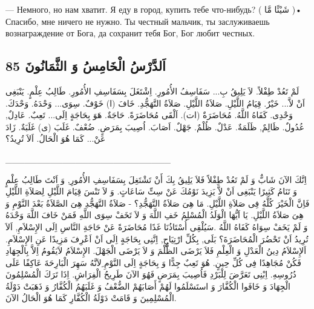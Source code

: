 \documentclass[a5paper]{article}
\begin{document}
— Немного, но нам хватит. Я еду в город, купить тебе что-нибудь? ( شَيْئًا مَّا )• Спасибо, мне ничего не нужно. Ты честный мальчик, ты заслуживаешь вознаграждение от Бога, да сохранит тебя Бог, Бог любит честных.

\subsection[اَلدَّرْسُ الْخَامِسُ وَ الثَّمَانُونَ 85]{اَلدَّرْسُ الْخَامِسُ وَ الثَّمَانُونَ 85}
لَمْ تَعُدْ طِفْلاً. لاَ يَلِيقُ بِ... سَفَاسِفُ الأُمُورِ. اِشْتَغَلَ بِسَفَاسِفِ الأُمُورِ. طَالِبُ عِلْمٍ. يَنْبَغِى اَنْ لاَّ... خَيْرٌ. قِيَامُ اللَّيْلِ. صَلاَةُ اللَّيْلِ. صَلاَةُ التَّهَجُّدِ. خَافَ (ا) خَوْفٌ. سِوَى... وَحْدَهُ. وَحْدَكَ. وَحْدِى. كَفَاهُ اللَّهُ. مُحَاضَرَةٌ (ات). اَلْقَى مُحَاضَرَةً. حَاجَةٌ. هَوَ بِحَاجَةٍ اِلَى... تَعِبٌ. عَادِلٌ, عُدُولٌ. ظَالِمٌ, ظَلَمَةٌ. عَدْلٌ. ظُلْمٌ. جَهْلٌ. اَصَابَ. اُصِيبَ بِمَرَضٍ. ضُعْفٌ. غَلَبَ (ى) غَلَبَةٌ. زَادَ عَنْ... كَمَا هُوَ الْحَالُ. اَلاَ تُرِيدُ؟

\_\_\_\_\_\_\_\_\_\_\_\_\_\_\_\_\_\_\_\_\_\_\_\_\_\_

اِنَّكَ الآنَ شَابٌّ وَ لَمْ تَعُدْ طِفْلاً فَلاَ يَلِيقُ بِكَ أَنْ تَشْتَغِلَ بِسَفَاسِفِ الأُمُورِ, وَ اَنْتَ طَالِبُ عِلْمٍ وَ تَنَامُ كَثِيرًا يَنْبَغِى اَنْ لاَّ يَزِيدَ نَوْمُكَ عَنْ سِتِّ سَاعَاتٍ. وَ لاَ تَنْسَ قِيَامَ اللَّيْلِ لِصَلاَةِ اللَّيْلِ فَاِنَّ الْخَيْرَ كُلَّهُ فِى صَلاَةِ اللَّيْلِ. مَا هِىَ صَلاَةُ التَّهَجُّدِ؟ - صَلاَةُ التَّهَجُّدِ هِىَ الصَّلاَةُ بَعْدَ النَّوْمِ وَ هِىَ صَلاَةُ اللَّيْلِ. يَا اَيُّهَا الْوَلَدُ الْمُسْلِمُ خَفِ اللَّهَ وَ لاَ تَخَفْ سِوَى اللَّهِ فَمَنْ خَافَ اللَّهَ وَحْدَهُ وَ لَمْ يَخَفْ سِوَاهُ كَفَاهُ اللَّهُ .سَيُلْقِى أُسْتَاذُنَا غَدًا مُحَاضَرَةً عَنْ حَاجَةِ النَّاسِ اِلَى الإِسْلاَمِ, اَلاَ تُرِيدُ اَنْ تَحْضُرَ الْمُحَاضَرَةَ؟ بَلَى, بِكُلِّ ارْتِيَاحٍ, اِنَّنِى بِحَاجَةٍ اِلَى اَنْ اَعْرِفَ مَزِيدًا عَنِ الإِسْلاَمِ. اَلإِسْلاَمُ دِينُ الْعَدْلِ وَ الْعِلْمِ فَلاَ يَرْضَى الظُّلْمَ وَ لاَ يَرْضَى الْجَهْلَ. الإِسْلاَمُ لاَيَقُومُ اِلاَّ بِالْجِهَادِ فَكُنْ مُجَاهِدًا فِى كُلِّ حِينٍ. هُوَ تَعِبٌ جِدًّا وَ بِحَاجَةٍ اِلَى النَّوْمِ ِلاَنَّهُ سَهِرَ الْبَارِحَةَ عَاكِفًا عَلَى دُرُوسِهِ. اِبْنِى تَعَرَّضَ لِلْبَرْدِ فَاُصِيبَ بِمَرَضٍ فَهُوَ الآنَ طَرِيحُ الْفِرَاشِ. اِذَا تَرَكَ الْمُسْلِمُونَ الْجِهَادَ وَ خَافَوا الْكُفَّارَ وَ استَسْلَمُوا لَهُمْ أَصَابَهُمْ الضُّعْفُ وَ غَلَبَهُمُ الْكُفَّارُ وَ ذَهَبَتْ دَوْلَةُ الْمُسْلِمِينَ وَ قَامَتْ دَوْلَةُ الْكُفَّارِ كَمَا هُوَ الْحَالُ الآنَ.
\end{document}
